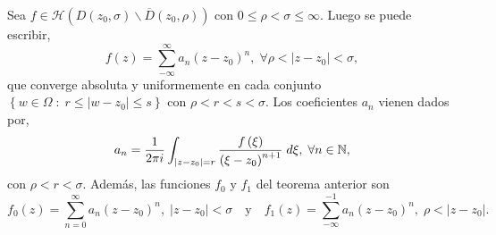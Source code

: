 \begin{theorem}
Sea $\displaystyle f \in \mathcal{H}\left(D\left(z_{0}, \sigma \right) \backslash \overline{D}\left(z_{0}, \rho\right)\right) $ con $\displaystyle 0 \leq \rho < \sigma \leq \infty  $. Luego se puede escribir, 
\[f\left(z\right)=\sum^{\infty}_{-\infty }a_{n}\left(z-z_{0}\right)^{n}, \; \forall \rho < \left|z-z_{0}\right|<\sigma  ,\]
que converge absoluta y uniformemente en cada conjunto $\displaystyle  \left\{ w \in \Omega \; : \; r \leq \left|w-z_{0}\right|\leq s\right\}  $ con $\displaystyle \rho < r < s < \sigma  $. Los coeficientes $\displaystyle a_{n} $ vienen dados por, 
\[a_{n} = \frac{1}{2\pi i}\int _{ \left|z-z_{0}\right|=r}\frac{f\left(\xi\right)}{\left(\xi-z_{0}\right)^{n+1}} \; d\xi, \; \forall n \in \mathbb{N} ,\]
con $\displaystyle \rho < r < \sigma  $. Además, las funciones $\displaystyle f_{0} $ y $\displaystyle f_{1} $ del teorema anterior son
\[f_{0}\left(z\right)=\sum^{\infty}_{n = 0}a_{n}\left(z-z_{0}\right)^{n}, \;  \left|z-z_{0}\right|<\sigma \quad \text{y} \quad f_{1}\left(z\right)=\sum^{-1}_{-\infty }a_{n}\left(z-z_{0}\right)^{n}, \;  \rho < \left|z-z_{0}\right| .\]	
\end{theorem}
